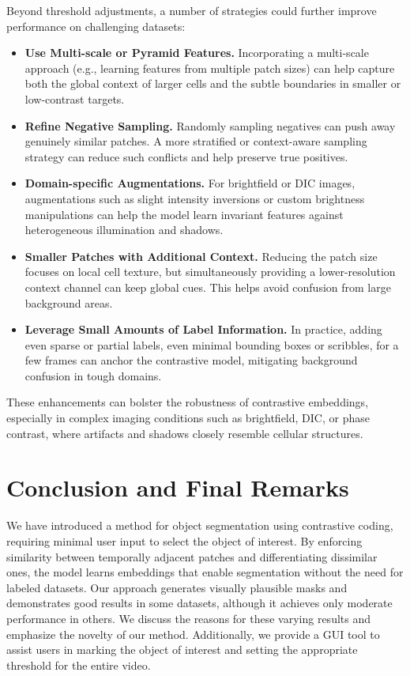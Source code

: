 \documentclass[./dissertation.tex]{subfiles}
\begin{document}
Beyond threshold adjustments, a number of strategies could further improve performance on challenging datasets:
\begin{itemize}
    \item \textbf{Use Multi-scale or Pyramid Features.} Incorporating a multi-scale approach (e.g., learning features from multiple patch sizes) can help capture both the global context of larger cells and the subtle boundaries in smaller or low-contrast targets.
    \item \textbf{Refine Negative Sampling.} Randomly sampling negatives can push away genuinely similar patches. A more stratified or context-aware sampling strategy can reduce such conflicts and help preserve true positives.
    \item \textbf{Domain-specific Augmentations.} For brightfield or DIC images, augmentations such as slight intensity inversions or custom brightness manipulations can help the model learn invariant features against heterogeneous illumination and shadows.
    \item \textbf{Smaller Patches with Additional Context.} Reducing the patch size focuses on local cell texture, but simultaneously providing a lower-resolution context channel can keep global cues. This helps avoid confusion from large background areas.
    \item \textbf{Leverage Small Amounts of Label Information.} In practice, adding even sparse or partial labels, even minimal bounding boxes or scribbles, for a few frames can anchor the contrastive model, mitigating background confusion in tough domains.
\end{itemize}

These enhancements can bolster the robustness of contrastive embeddings, especially in complex imaging conditions such as brightfield, DIC, or phase contrast, where artifacts and shadows closely resemble cellular structures.

\label{cc:Conclusion}
\section{Conclusion and Final Remarks}

We have introduced a method for object segmentation using contrastive coding, requiring minimal user input to select the object of interest. By enforcing similarity between temporally adjacent patches and differentiating dissimilar ones, the model learns embeddings that enable segmentation without the need for labeled datasets. Our approach generates visually plausible masks and demonstrates good results in some datasets, although it achieves only moderate performance in others. We discuss the reasons for these varying results and emphasize the novelty of our method. Additionally, we provide a GUI tool to assist users in marking the object of interest and setting the appropriate threshold for the entire video.
\end{document}
